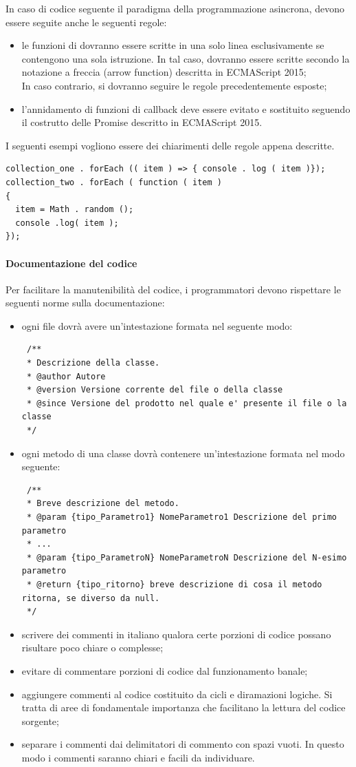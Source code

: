 In caso di codice seguente il paradigma della programmazione asincrona, devono essere seguite anche le seguenti regole:
\begin{itemize}
	\item le funzioni di  dovranno essere scritte in una solo linea esclusivamente se contengono una sola istruzione. In tal caso, dovranno essere scritte secondo la notazione a freccia (arrow function) descritta in ECMAScript 2015;\\
	 In caso contrario, si dovranno seguire le regole precedentemente esposte;
	 \item l'annidamento di funzioni di callback deve essere evitato e sostituito seguendo il costrutto delle Promise descritto in ECMAScript 2015.
\end{itemize}

I seguenti esempi vogliono essere dei chiarimenti delle regole appena descritte.
\begin{lstlisting}
collection_one . forEach (( item ) => { console . log ( item )});
collection_two . forEach ( function ( item )
{
  item = Math . random ();
  console .log( item );
});
\end{lstlisting}


\paragraph{Documentazione del codice}\label{intestazione}
Per facilitare la manutenibilità del codice, i programmatori devono rispettare le seguenti norme sulla documentazione:
\begin{itemize}
 \item ogni file dovrà avere un'intestazione formata nel seguente modo:
 \begin{lstlisting}
 /**
 * Descrizione della classe.
 * @author Autore
 * @version Versione corrente del file o della classe
 * @since Versione del prodotto nel quale e' presente il file o la classe
 */
 \end{lstlisting}
 \item ogni metodo di una classe dovrà contenere un'intestazione formata nel modo seguente:
 \begin{lstlisting}
 /**
 * Breve descrizione del metodo.
 * @param {tipo_Parametro1} NomeParametro1 Descrizione del primo parametro
 * ...
 * @param {tipo_ParametroN} NomeParametroN Descrizione del N-esimo parametro
 * @return {tipo_ritorno} breve descrizione di cosa il metodo ritorna, se diverso da null.
 */

 \end{lstlisting}
 \item scrivere dei commenti in italiano qualora certe porzioni di codice possano risultare poco chiare o complesse;
 \item evitare di commentare porzioni di codice dal funzionamento banale;
 \item aggiungere commenti al codice costituito da cicli e diramazioni logiche. Si tratta di aree
 	di fondamentale importanza che facilitano la lettura del codice sorgente;
 \item separare i commenti dai delimitatori di commento con spazi vuoti. In questo modo i
 	commenti saranno chiari e facili da individuare.
\end{itemize}
